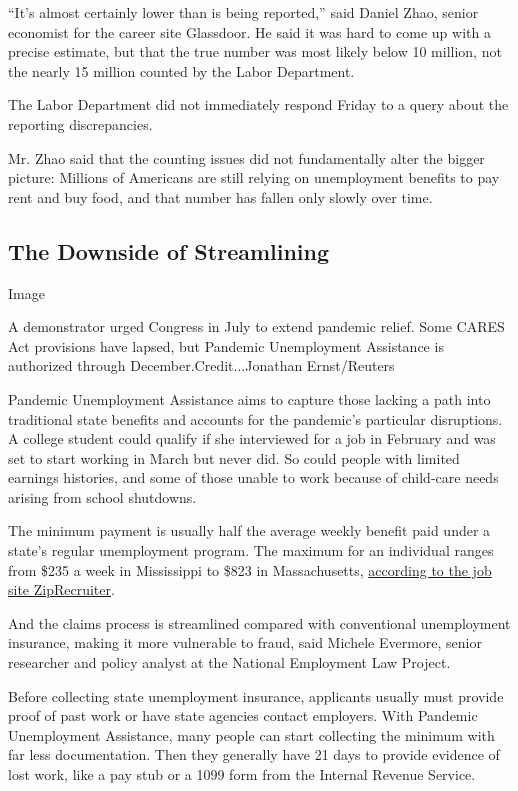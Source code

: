 ``It's almost certainly lower than is being reported,'' said Daniel
Zhao, senior economist for the career site Glassdoor. He said it was
hard to come up with a precise estimate, but that the true number was
most likely below 10 million, not the nearly 15 million counted by the
Labor Department.

The Labor Department did not immediately respond Friday to a query about
the reporting discrepancies.

Mr. Zhao said that the counting issues did not fundamentally alter the
bigger picture: Millions of Americans are still relying on unemployment
benefits to pay rent and buy food, and that number has fallen only
slowly over time.

\hypertarget{the-downside-of-streamlining}{%
\subsection{The Downside of
Streamlining}\label{the-downside-of-streamlining}}

Image

A demonstrator urged Congress in July to extend pandemic relief. Some
CARES Act provisions have lapsed, but Pandemic Unemployment Assistance
is authorized through December.Credit...Jonathan Ernst/Reuters

Pandemic Unemployment Assistance aims to capture those lacking a path
into traditional state benefits and accounts for the pandemic's
particular disruptions. A college student could qualify if she
interviewed for a job in February and was set to start working in March
but never did. So could people with limited earnings histories, and some
of those unable to work because of child-care needs arising from school
shutdowns.

The minimum payment is usually half the average weekly benefit paid
under a state's regular unemployment program. The maximum for an
individual ranges from \$235 a week in Mississippi to \$823 in
Massachusetts,
\href{https://www.ziprecruiter.com/blog/unemployment-benefits-by-state/}{according
to the job site ZipRecruiter}.

And the claims process is streamlined compared with conventional
unemployment insurance, making it more vulnerable to fraud, said Michele
Evermore, senior researcher and policy analyst at the National
Employment Law Project.

Before collecting state unemployment insurance, applicants usually must
provide proof of past work or have state agencies contact employers.
With Pandemic Unemployment Assistance, many people can start collecting
the minimum with far less documentation. Then they generally have 21
days to provide evidence of lost work, like a pay stub or a 1099 form
from the Internal Revenue Service.

